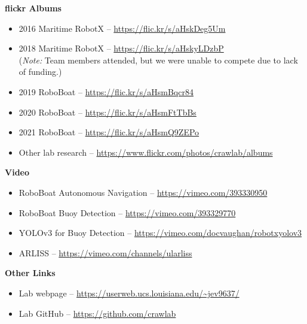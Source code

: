 \documentclass[12 pt]{article}
\begin{document}
\textbf{flickr Albums}
\vspace{-0.2in}
\begin{itemize}[noitemsep,nolistsep]
	\item 2016 Maritime RobotX -- \url{https://flic.kr/s/aHskDeg5Um}
	\item 2018 Maritime RobotX -- \url{https://flic.kr/s/aHskyLDzbP} \\(\textit{Note:} Team members attended, but we were unable to compete due to lack of funding.)
	\item 2019 RoboBoat -- \url{https://flic.kr/s/aHsmBqcr84}
	\item 2020 RoboBoat -- \url{https://flic.kr/s/aHsmFtTbBs}
	\item 2021 RoboBoat -- \url{https://flic.kr/s/aHsmQ9ZEPo}
	\item Other lab research -- \url{https://www.flickr.com/photos/crawlab/albums}
\end{itemize}

\textbf{Video}
\vspace{-0.2in}
\begin{itemize}[noitemsep,nolistsep]
	\item RoboBoat Autonomous Navigation -- \url{https://vimeo.com/393330950}
	\item RoboBoat Buoy Detection -- \url{https://vimeo.com/393329770}
	\item YOLOv3 for Buoy Detection -- \url{https://vimeo.com/docvaughan/robotxyolov3}
	\item ARLISS -- \url{https://vimeo.com/channels/ularliss}
\end{itemize}
	
\textbf{Other Links}
\vspace{-0.2in}
\begin{itemize}[noitemsep,nolistsep]
	\item Lab webpage -- \url{https://userweb.ucs.louisiana.edu/~jev9637/}
	\item Lab GitHub -- \url{https://github.com/crawlab}
\end{itemize}
\end{document}
